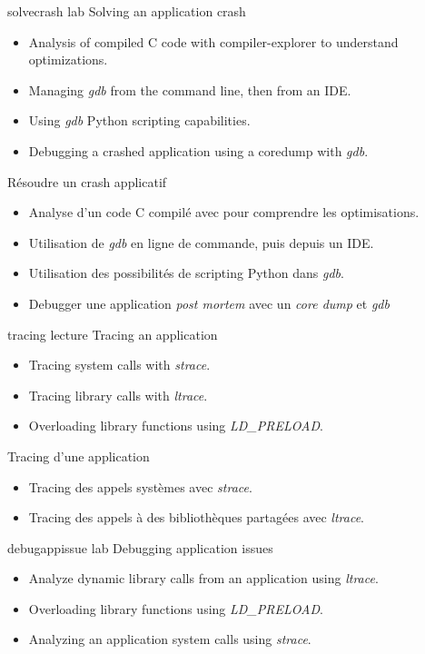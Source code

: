 {solvecrash}
{lab}
{Solving an application crash}
{
  \begin{itemize}
  \item Analysis of compiled C code with compiler-explorer to understand
    optimizations.
  \item Managing {\em gdb} from the command line, then from an IDE.
  \item Using {\em gdb} Python scripting capabilities.
  \item Debugging a crashed application using a coredump with {\em gdb}.
  \end{itemize}
}
{Résoudre un crash applicatif}
{
  \begin{itemize}
  \item Analyse d'un code C compilé avec  pour
    comprendre les optimisations.
  \item Utilisation de {\em gdb} en ligne de commande, puis depuis un
    IDE.
  \item Utilisation des possibilités de scripting Python dans {\em gdb}.
  \item Debugger une application {\em post mortem} avec un {\em core
      dump} et {\em gdb}
  \end{itemize}
}
{tracing}
{lecture}
{Tracing an application}
{
  \begin{itemize}
  \item Tracing system calls with {\em strace}.
  \item Tracing library calls with {\em ltrace}.
  \item Overloading library functions using {\em LD\_PRELOAD}.
  \end{itemize}
}
{Tracing d'une application}
{
  \begin{itemize}
  \item Tracing des appels systèmes avec {\em strace}.
  \item Tracing des appels à des bibliothèques partagées avec {\em ltrace}.
  \end{itemize}
}
{debugappissue}
{lab}
{Debugging application issues}
{
  \begin{itemize}
  \item Analyze dynamic library calls from an application using
    {\em ltrace}.
  \item Overloading library functions using {\em LD\_PRELOAD}.
  \item Analyzing an application system calls using {\em strace}.
  \end{itemize}
}
